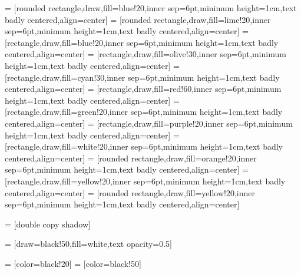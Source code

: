 
 = [rounded rectangle,draw,fill=blue!20,inner sep=6pt,minimum height=1cm,text badly centered,align=center]
 = [rounded rectangle,draw,fill=lime!20,inner sep=6pt,minimum height=1cm,text badly centered,align=center]
 = [rectangle,draw,fill=blue!20,inner sep=6pt,minimum height=1cm,text badly centered,align=center]
 = [rectangle,draw,fill=olive!30,inner sep=6pt,minimum height=1cm,text badly centered,align=center]
 = [rectangle,draw,fill=cyan!30,inner sep=6pt,minimum height=1cm,text badly centered,align=center]
 = [rectangle,draw,fill=red!60,inner sep=6pt,minimum height=1cm,text badly centered,align=center]
 = [rectangle,draw,fill=green!20,inner sep=6pt,minimum height=1cm,text badly centered,align=center]
 = [rectangle,draw,fill=purple!20,inner sep=6pt,minimum height=1cm,text badly centered,align=center]
 = [rectangle,draw,fill=white!20,inner sep=6pt,minimum height=1cm,text badly centered,align=center]
 = [rounded rectangle,draw,fill=orange!20,inner sep=6pt,minimum height=1cm,text badly centered,align=center]
 = [rectangle,draw,fill=yellow!20,inner sep=6pt,minimum height=1cm,text badly centered,align=center]
 = [rounded rectangle,draw,fill=yellow!20,inner sep=6pt,minimum height=1cm,text badly centered,align=center]

 = [double copy shadow]

 = [draw=black!50,fill=white,text opacity=0.5]

 = [color=black!20]
 = [color=black!50]


